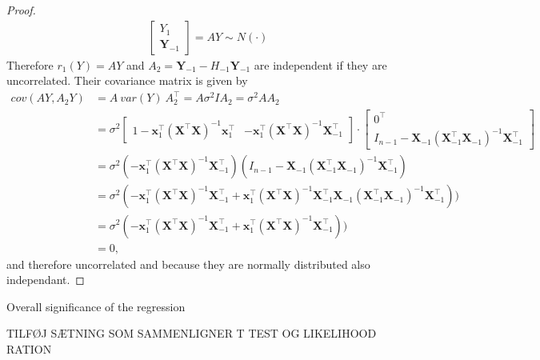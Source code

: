 \begin{proof}
\begin{align*}
\begin{bmatrix}
            Y_1 \\
            \textbf{Y}_{-1}
        \end{bmatrix}
        =
        AY \sim N(\cdot)
    \end{align*}
    Therefore $r_1(Y) = AY$ and $A_2 = \textbf{Y}_{-1} - H_{-1} \textbf{Y}_{-1}$ are independent if they are uncorrelated. Their covariance matrix is given by 
    \begin{align*}
        cov(A Y, A_2 Y) &= A\  var(Y) \ A_2^\top = A \sigma^2 I A_2 = \sigma^2 A A_2 \\
        &= \sigma^2 
        \begin{bmatrix}
            1 - \textbf{x}_1^\top (\textbf{X}^\top \textbf{X})^{-1} \textbf{x}_1^\top & - \textbf{x}_1^\top (\textbf{X}^\top \textbf{X})^{-1} \textbf{X}_{-1}^\top
        \end{bmatrix}
        \cdot
        \begin{bmatrix}
            0^\top \\
            I_{n-1} - \textbf{X}_{-1} (\textbf{X}_{-1}^\top \textbf{X}_{-1})^{-1} \textbf{X}_{-1}^\top
        \end{bmatrix} \\
        &= \sigma^2 (- \textbf{x}_1^\top (\textbf{X}^\top \textbf{X})^{-1} \textbf{X}_{-1}^\top) (I_{n-1} - \textbf{X}_{-1} (\textbf{X}_{-1}^\top \textbf{X}_{-1})^{-1} \textbf{X}_{-1}^\top) \\
        &= \sigma^2 (- \textbf{x}_1^\top (\textbf{X}^\top \textbf{X})^{-1} \textbf{X}_{-1}^\top + \textbf{x}_1^\top (\textbf{X}^\top \textbf{X})^{-1} \textbf{X}_{-1}^\top \textbf{X}_{-1} (\textbf{X}_{-1}^\top \textbf{X}_{-1})^{-1} \textbf{X}_{-1}^\top)) \\
        &= \sigma^2 (- \textbf{x}_1^\top (\textbf{X}^\top \textbf{X})^{-1} \textbf{X}_{-1}^\top + \textbf{x}_1^\top (\textbf{X}^\top \textbf{X})^{-1} \textbf{X}_{-1}^\top)) \\
        &= 0,
    \end{align*}
    and therefore uncorrelated and because they are normally distributed also independant.
\end{proof}

Overall significance of the regression

TILFØJ SÆTNING SOM SAMMENLIGNER T TEST OG LIKELIHOOD RATION





